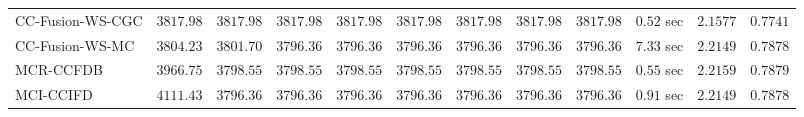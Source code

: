 \begin{table}[H]
\begin{tabular}{lrrrrrrrrrrr}
    CC-Fusion-WS-CGC & $      3817.98$ & $      3817.98$ & $      3817.98$ & $      3817.98$ & $      3817.98$ & $      3817.98$ & $      3817.98$ & $      3817.98$ & $         0.52$ sec    & $       2.1577$  & $       0.7741$ \\ 
     CC-Fusion-WS-MC & $      3804.23$ & $      3801.70$ & $      3796.36$ & $      3796.36$ & $      3796.36$ & $      3796.36$ & $      3796.36$ & $      3796.36$ & $         7.33$ sec    & $       2.2149$  & $       0.7878$ \\ 
\cmidrule{1-1} 
           MCR-CCFDB & $      3966.75$ & $      3798.55$ & $      3798.55$ & $      3798.55$ & $      3798.55$ & $      3798.55$ & $      3798.55$ & $      3798.55$ & $         0.55$ sec    & $       2.2159$  & $       0.7879$ \\ 
\cmidrule{1-1} 
           MCI-CCIFD & $      4111.43$ & $      3796.36$ & $      3796.36$ & $      3796.36$ & $      3796.36$ & $      3796.36$ & $      3796.36$ & $      3796.36$ & $         0.91$ sec    & $       2.2149$  & $       0.7878$ \\ 
\bottomrule
\end{tabular}
\end{table}

